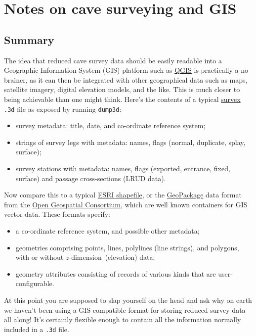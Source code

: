 \documentclass[]{article}
\providecommand{\tightlist}{%
  \setlength{\itemsep}{0pt}\setlength{\parskip}{0pt}}
\newcommand{\zdimension}{$z$-dimension}
\begin{document}
\section{Notes on cave surveying and GIS}

\subsection{Summary}\label{summary}

The idea that reduced cave survey data should be easily readable into a
Geographic Information System (GIS) platform such as
\href{http://www.qgis.org/}{QGIS} is practically a no-brainer, as it can
then be integrated with other geographical data such as maps, satellite
imagery, digital elevation models, and the like. This is much closer
to being achievable than one might think. Here's the contents of a
typical \href{https://survex.com/}{survex} \verb}.3d} file as exposed
by running \verb}dump3d}:

\begin{itemize}
\tightlist
\item
  survey metadata: title, date, and co-ordinate reference system;
\item
  strings of survey legs with metadata: names, flags (normal, duplicate,
  splay, surface);
\item
  survey stations with metadata: names, flags (exported, entrance,
  fixed, surface) and passage cross-sections (LRUD data).
\end{itemize}

Now compare this to a typical
\href{https://en.wikipedia.org/wiki/Shapefile}{ESRI shapefile}, or the
\href{https://en.wikipedia.org/wiki/GeoPackage}{GeoPackage} data format
from the
\href{https://en.wikipedia.org/wiki/Open_Geospatial_Consortium}{Open
Geospatial Consortium}, which are well known containers for GIS vector
data. These formats specify:

\begin{itemize}
\tightlist
\item
  a co-ordinate reference system, and possible other metadata;
\item
  geometries comprising points, lines, polylines (line strings), and
  polygons, with or without \zdimension\ (elevation) data;
\item
  geometry attributes consisting of records of various kinds that are
  user-configurable.
\end{itemize}

At this point you are supposed to slap yourself on the head and ask
why on earth we haven't been using a GIS-compatible format for storing
reduced survey data all along!  It's certainly flexible enough
to contain all the information normally included in a \verb}.3d} file.
\end{document}
